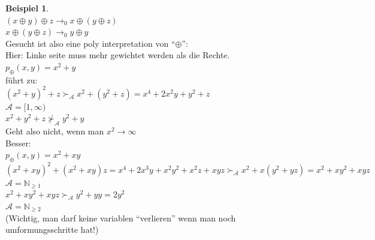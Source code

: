 \documentclass{article}
\newcommand{\smallAscr}{\scriptscriptstyle\mathcal{A}}
\theoremstyle{definition}
\newtheorem{beispiel}{Beispiel}[section]
\begin{document}
	\begin{beispiel}\ \\
	 $(x\oplus y)\oplus z\to_0 x\oplus (y\oplus z)$\\
	 $x\oplus(y\oplus z)\to_0 y\oplus y$\\
	 Gesucht ist also eine poly interpretation von ``$\oplus$'':\\
	 Hier: Linke seite muss mehr gewichtet werden
	 als die Rechte.\\
	 $p_{\oplus}(x,y)= x^2+y$\\
	 führt zu:\\
	 $(x^2+y)^2+z\succ_{\smallAscr} x^2+(y^2+z) = x^4+2x^2y+y^2+z$\\
	 $\mathcal{A} = [1,\infty)$\\
	 $x^2+y^2+z\nsucc_{\smallAscr} y^2+y$\\
	 Geht also nicht, wenn man $x^2\to\infty$\\
	 Besser:\\
	 $p_{\oplus}(x,y)=x^2+xy$\\
	 $(x^2+xy)^2+(x^2+xy)z = x^4+2x^3y+x^2y^2+x^2z+xyz\succ_{\smallAscr} x^2+x(y^2+yz) = x^2+xy^2+xyz$\\
	 $\mathcal{A} = \mathbb{N}_{\geq1}$\\
	 $x^2+xy^2+xyz\succ_{\smallAscr}y^2+yy=2y^2$\\
	 $\mathcal{A} = \mathbb{N}_{\geq2}$\\
	 (Wichtig, man darf keine variablen ``verlieren'' wenn man noch umformungsschritte hat!)
	\end{beispiel}
\end{document}

